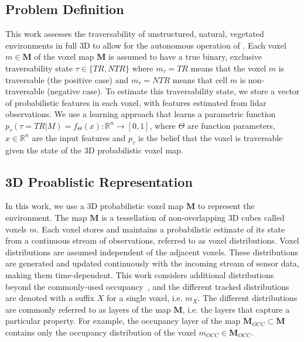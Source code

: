 \subsection{Problem Definition}
\label{subsec:problem_def}
This work assesses the traversability of unstructured, natural, vegetated environments in full 3D to allow for the autonomous operation of . Each voxel $m \in \textbf{M}$ of the voxel map $\mathbf{M}$ is assumed to have a true binary, exclusive traversability state $\tau \in \{ TR, NTR\}$ where $m_\tau = TR$ means that the voxel $m$ is traversable (the positive case) and $m_\tau = NTR$ means that cell $m$ is non-traversable (negative case). To estimate this traversability state, we store a vector of probabilistic features in each voxel, with features estimated from lidar observations. We use a learning approach that learns a parametric function $ p_\tau (\tau=TR | M) = f_\Theta(x): \mathbb{R}^n \rightarrow \left[0, 1\right]$, where $\Theta$ are function parameters, $x \in \mathbb{R}^n$ are the input features and $p_\tau$ is the belief that the voxel is traversable given the state of the 3D probabilistic voxel map. 
 
\subsection{3D Proablistic Representation}
\label{subsec:map_rep}
In this work, we use a 3D probabilistic voxel map $\mathbf{M}$ to represent the environment. The map $\mathbf{M}$ is a tessellation of non-overlapping 3D cubes called voxels $m$. Each voxel stores and maintains a probabilistic estimate of its state from a continuous stream of observations, referred to as voxel distributions. Voxel distributions are assumed independent of the adjacent voxels. These distributions are generated and updated continuously with the incoming stream of sensor data, making them time-dependent. This work considers additional distributions beyond the commonly-used occupancy~\cite{hornung2013octomap}, and the different tracked distributions are denoted with a suffix $X$ for a single voxel, i.e. $m_X$. The different distributions are commonly referred to as layers of the map $\mathbf{M}$, i.e. the layers that capture a particular property. For example, the occupancy layer of the map $ \mathbf{M}_{OCC} \subset \mathbf{M}$ contains only the occupancy distribution of the voxel $m_{OCC} \in \mathbf{M}_{OCC}$.


